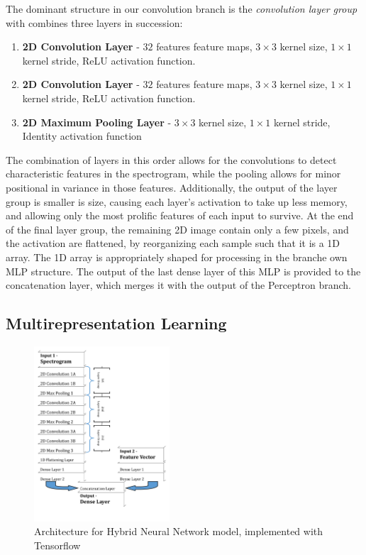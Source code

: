 \documentclass[conference,onecolumn,letterpaper]{IEEEtran}
\begin{document}
The dominant structure in our convolution branch is the \textit{convolution layer group} with combines three layers in succession:
\begin{enumerate}
    \item \textbf{2D Convolution Layer} - $32$ features feature maps, $3 \times 3$ kernel size, $1 \times 1$ kernel stride, ReLU activation function.
    \item \textbf{2D Convolution Layer} - $32$ features feature maps, $3 \times 3$ kernel size, $1 \times 1$ kernel stride, ReLU activation function.
    \item \textbf{2D Maximum Pooling Layer} - $3 \times 3$ kernel size, $1 \times 1$ kernel stride, Identity activation function
\end{enumerate}
The combination of layers in this order allows for the convolutions to detect characteristic features in the spectrogram, while the pooling allows for minor positional in variance in those features. Additionally, the output of the layer group is smaller is size, causing each layer's activation to take up less memory, and allowing only the most prolific features of each input to survive. At the end of the final layer group, the remaining 2D image contain only a few pixels, and the activation are flattened, by reorganizing each sample such that it is a 1D array. The 1D array is appropriately shaped for processing in the branche own MLP structure. The output of the last dense layer of this MLP is provided to the concatenation layer, which merges it with the output of the Perceptron branch. 


\subsection{Multirepresentation Learning}
\label{subsec:Multimodal}


\begin{figure}[h]
    \centering
    \includegraphics[width=0.45\textwidth]{figures/NeuralNetworkArchitecture.png}
    \caption{Architecture for Hybrid Neural Network model, implemented with Tensorflow \cite{Tensorflow}}
    \label{fig:Architecture}
\end{figure}
\end{document}
